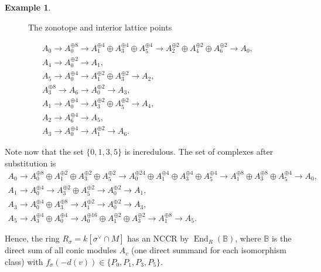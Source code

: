 \documentclass[reqno, 12pt]{amsart}
\theoremstyle{definition}
\newtheorem{example}[theorem]{Example}
\numberwithin{equation}{section}
\newcommand{\End}{\operatorname{End}}
\begin{document}
\begin{example}
\begin{figure}
\label{fig:2Dexample}
\caption{The zonotope and interior lattice points}
\end{figure}

\begin{align*}
    A_0\rightarrow A_0^{\oplus 8}\rightarrow A_1^{\oplus 4}\oplus A_3^{\oplus 4}\oplus A_5^{\oplus 4}\rightarrow A_2^{\oplus 2}\oplus A_4^{\oplus 2}\oplus A_6^{\oplus 2}\rightarrow A_0,&\\
    A_4\rightarrow A_0^{\oplus 2}\rightarrow A_1,&\\
    A_5\rightarrow A_0^{\oplus 4}\rightarrow A_1^{\oplus 2}\oplus A_3^{\oplus 2}\rightarrow A_2,&\\
    A_3^{\oplus 8}\rightarrow A_6\rightarrow A_0^{\oplus 2}\rightarrow A_3,&\\
    A_1\rightarrow A_0^{\oplus 4}\rightarrow A_3^{\oplus 2}\oplus A_5^{\oplus 2}\rightarrow A_4,&\\
    A_2\rightarrow A_6^{\oplus 4}\rightarrow A_5,&\\
    A_3\rightarrow A_0^{\oplus 4}\rightarrow A_1^{\oplus 2}\rightarrow A_6.&\;
\end{align*}

Note now that the set $\{0,1,3,5\}$ is incredulous. The set of complexes after substitution is\begin{align*}
    A_0\rightarrow A_0^{\oplus 8}\oplus A_1^{\oplus 2}\oplus A_3^{\oplus 2}\oplus A_5^{\oplus 2}\rightarrow A_0^{\oplus 24}\oplus A_1^{\oplus 4}\oplus A_3^{\oplus 4}\oplus A_5^{\oplus 4}\rightarrow A_1^{\oplus 8}\oplus A_3^{\oplus 8}\oplus A_5^{\oplus 4}\rightarrow A_0,&\\
    A_1\rightarrow A_0^{\oplus 4}\rightarrow A_3^{\oplus 2}\oplus A_5^{\oplus 2}\rightarrow A_0^{\oplus 2}\rightarrow A_1,&\\
    A_3\rightarrow A_0^{\oplus 4}\oplus A_3^{\oplus 8}\rightarrow A_1^{\oplus 2}\rightarrow A_0^{\oplus 2}\rightarrow A_3,&\\
    A_5\rightarrow A_3^{\oplus 4}\oplus A_0^{\oplus 4}\rightarrow A_0^{\oplus 16}\oplus A_1^{\oplus 2}\oplus A_3^{\oplus 2}\rightarrow A_1^{\oplus 8}\rightarrow A_5.&\;
\end{align*}

Hence, the ring $R_\sigma=k[\sigma^\vee\cap M]$ has an NCCR by $\End_R(\mathbb{B})$, where $\mathbb{B}$ is the direct sum of all conic modules $A_v$ (one direct summand for each isomorphism class) with $f_\sigma(-d(v))\in \{P_0, P_1, P_3, P_5\}$. 
\end{example}
\end{document}
